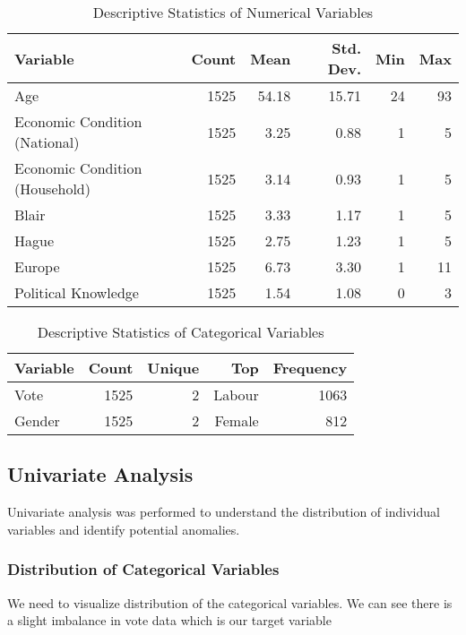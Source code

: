 \documentclass[12pt]{article}
\begin{document}
\begin{table}[H]
\centering
\caption{Descriptive Statistics of Numerical Variables}
\label{tab:desc_stats}
\begin{tabular}{lrrrrr}
\toprule
\textbf{Variable} & \textbf{Count} & \textbf{Mean} & \textbf{Std. Dev.} & \textbf{Min} & \textbf{Max} \\
\midrule
Age & 1525 & 54.18 & 15.71 & 24 & 93 \\
Economic Condition (National) & 1525 & 3.25 & 0.88 & 1 & 5 \\
Economic Condition (Household) & 1525 & 3.14 & 0.93 & 1 & 5 \\
Blair & 1525 & 3.33 & 1.17 & 1 & 5 \\
Hague & 1525 & 2.75 & 1.23 & 1 & 5 \\
Europe & 1525 & 6.73 & 3.30 & 1 & 11 \\
Political Knowledge & 1525 & 1.54 & 1.08 & 0 & 3 \\
\bottomrule
\end{tabular}
\end{table}

\begin{table}[H]
\centering
\caption{Descriptive Statistics of Categorical Variables}
\label{tab:desc_categorical}
\begin{tabular}{lrrrr}
\toprule
\textbf{Variable} & \textbf{Count} & \textbf{Unique} & \textbf{Top} & \textbf{Frequency} \\
\midrule
Vote & 1525 & 2 & Labour & 1063 \\
Gender & 1525 & 2 & Female & 812 \\
\bottomrule
\end{tabular}
\end{table}

\subsection{Univariate Analysis}
Univariate analysis was performed to understand the distribution of individual variables and identify potential anomalies.

\subsubsection{Distribution of Categorical Variables}

We need to visualize distribution of the categorical variables. We can see there is a slight imbalance in vote data which is our target variable 
\end{document}
